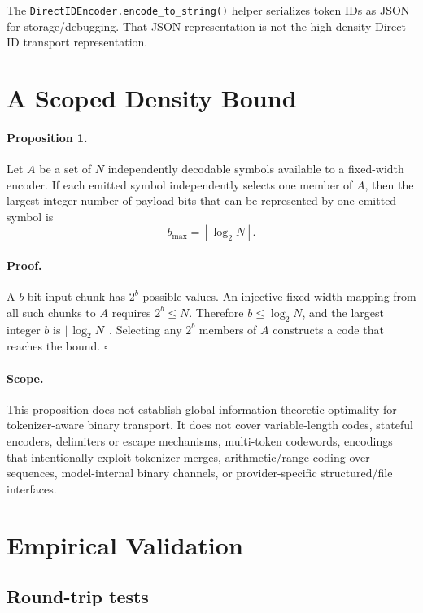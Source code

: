 \documentclass[11pt,a4paper]{article}
\begin{document}
The \texttt{DirectIDEncoder.encode\_to\_string()} helper serializes token IDs as JSON for storage/debugging. That JSON representation is not the high-density Direct-ID transport representation.

\section{A Scoped Density Bound}

\paragraph{Proposition 1.}
Let \(A\) be a set of \(N\) independently decodable symbols available to a fixed-width encoder. If each emitted symbol independently selects one member of \(A\), then the largest integer number of payload bits that can be represented by one emitted symbol is
\[
b_{\max}=\left\lfloor \log_2 N \right\rfloor.
\]

\paragraph{Proof.}
A \(b\)-bit input chunk has \(2^b\) possible values. An injective fixed-width mapping from all such chunks to \(A\) requires \(2^b \le N\). Therefore \(b \le \log_2 N\), and the largest integer \(b\) is \(\lfloor \log_2 N \rfloor\). Selecting any \(2^b\) members of \(A\) constructs a code that reaches the bound. \(\square\)

\paragraph{Scope.}
This proposition does not establish global information-theoretic optimality for tokenizer-aware binary transport. It does not cover variable-length codes, stateful encoders, delimiters or escape mechanisms, multi-token codewords, encodings that intentionally exploit tokenizer merges, arithmetic/range coding over sequences, model-internal binary channels, or provider-specific structured/file interfaces.

\section{Empirical Validation}

\subsection{Round-trip tests}
\end{document}
